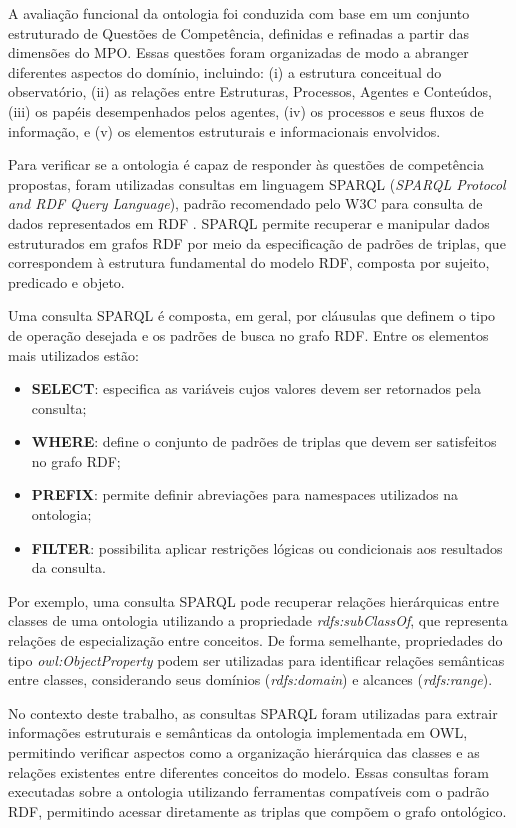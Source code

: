 A avaliação funcional da ontologia foi conduzida com base em um conjunto estruturado de Questões de Competência, definidas e refinadas a partir das dimensões do MPO. Essas questões foram organizadas de modo a abranger diferentes aspectos do domínio, incluindo: (i) a estrutura conceitual do observatório, (ii) as relações entre Estruturas, Processos, Agentes e Conteúdos, (iii) os papéis desempenhados pelos agentes, (iv) os processos e seus fluxos de informação, e (v) os elementos estruturais e informacionais envolvidos.

Para verificar se a ontologia é capaz de responder às questões de competência propostas, foram utilizadas consultas em linguagem SPARQL (\textit{SPARQL Protocol and RDF Query Language}), padrão recomendado pelo W3C para consulta de dados representados em RDF \cite{sparql2013}. SPARQL permite recuperar e manipular dados estruturados em grafos RDF por meio da especificação de padrões de triplas, que correspondem à estrutura fundamental do modelo RDF, composta por sujeito, predicado e objeto.

Uma consulta SPARQL é composta, em geral, por cláusulas que definem o tipo de operação desejada e os padrões de busca no grafo RDF. Entre os elementos mais utilizados estão:

\begin{itemize}
\item \textbf{SELECT}: especifica as variáveis cujos valores devem ser retornados pela consulta;
\item \textbf{WHERE}: define o conjunto de padrões de triplas que devem ser satisfeitos no grafo RDF;
\item \textbf{PREFIX}: permite definir abreviações para namespaces utilizados na ontologia;
\item \textbf{FILTER}: possibilita aplicar restrições lógicas ou condicionais aos resultados da consulta.
\end{itemize}

Por exemplo, uma consulta SPARQL pode recuperar relações hierárquicas entre classes de uma ontologia utilizando a propriedade \textit{rdfs:subClassOf}, que representa relações de especialização entre conceitos. De forma semelhante, propriedades do tipo \textit{owl:ObjectProperty} podem ser utilizadas para identificar relações semânticas entre classes, considerando seus domínios (\textit{rdfs:domain}) e alcances (\textit{rdfs:range}).

No contexto deste trabalho, as consultas SPARQL foram utilizadas para extrair informações estruturais e semânticas da ontologia implementada em OWL, permitindo verificar aspectos como a organização hierárquica das classes e as relações existentes entre diferentes conceitos do modelo. Essas consultas foram executadas sobre a ontologia utilizando ferramentas compatíveis com o padrão RDF, permitindo acessar diretamente as triplas que compõem o grafo ontológico.

